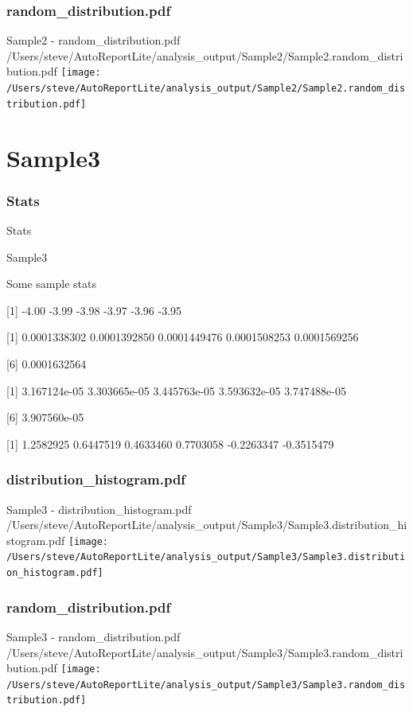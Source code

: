 \documentclass[8pt]{beamer}\usepackage[]{graphicx}\usepackage[]{color}
\begin{document}
\subsubsection{random\_distribution.pdf}
\begin{frame}{Sample2 - random\_distribution.pdf }
\scriptsize{/Users/steve/AutoReportLite/analysis\_output/Sample2/Sample2.random\_distribution.pdf}
\texttt{[image: /Users/steve/AutoReportLite/analysis\_output/Sample2/Sample2.random\_distribution.pdf]}
\end{frame}

\section{Sample3}
\subsubsection{Stats}
\begin{frame}{Stats }
\small{
Sample3 

Some sample stats

[1] -4.00 -3.99 -3.98 -3.97 -3.96 -3.95

[1] 0.0001338302 0.0001392850 0.0001449476 0.0001508253 0.0001569256

[6] 0.0001632564

[1] 3.167124e-05 3.303665e-05 3.445763e-05 3.593632e-05 3.747488e-05

[6] 3.907560e-05

[1]  1.2582925  0.6447519  0.4633460  0.7703058 -0.2263347 -0.3515479
}

\end{frame}

\subsubsection{distribution\_histogram.pdf}
\begin{frame}{Sample3 - distribution\_histogram.pdf }
\scriptsize{/Users/steve/AutoReportLite/analysis\_output/Sample3/Sample3.distribution\_histogram.pdf}
\texttt{[image: /Users/steve/AutoReportLite/analysis\_output/Sample3/Sample3.distribution\_histogram.pdf]}
\end{frame}

\subsubsection{random\_distribution.pdf}
\begin{frame}{Sample3 - random\_distribution.pdf }
\scriptsize{/Users/steve/AutoReportLite/analysis\_output/Sample3/Sample3.random\_distribution.pdf}
\texttt{[image: /Users/steve/AutoReportLite/analysis\_output/Sample3/Sample3.random\_distribution.pdf]}
\end{frame}
\end{document}
